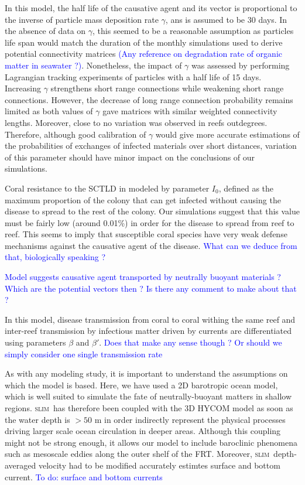 \documentclass[utf8]{frontiersSCNS}
\newcommand{\slim}{\textsc{slim}\ }
\begin{document}
In this model, the half life of the causative agent and its vector is proportional to the inverse of particle mass deposition rate $\gamma$, ans is assumed to be 30 days. In the absence of data on $\gamma$, this seemed to be a reasonable assumption as particles life span would match the duration of the monthly simulations used to derive potential connectivity matrices \textcolor{blue}{(Any reference on degradation rate of organic matter in seawater ?)}. Nonetheless, the impact of $\gamma$ was assessed by performing Lagrangian tracking experiments of particles with a half life of 15 days. Increasing $\gamma$ strengthens short range connections while weakening short range connections. However, the decrease of long range connection probability remains limited as both values of $\gamma$ gave matrices with similar weighted connectivity lengths. Moreover, close to no variation was observed in reefs outdegrees. Therefore, although good calibration of $\gamma$ would give more accurate estimations of the probabilities of exchanges of infected materials over short distances, variation of this parameter should have minor impact on the conclusions of our simulations.

Coral resistance to the SCTLD in modeled by parameter $I_0$, defined as the maximum proportion of the colony that can get infected without causing the disease to spread to the rest of the colony. Our simulations suggest that this value must be fairly low (around 0.01\%) in order for the disease to spread from reef to reef. This seems to imply that susceptible coral species have very weak defense mechanisms against the causative agent of the disease. \textcolor{blue}{What can we deduce from that, biologically speaking ?}

\textcolor{blue}{Model suggests causative agent transported by neutrally buoyant materials ? Which are the potential vectors then ? Is there any comment to make about that ?}

In this model, disease transmission from coral to coral withing the same reef and inter-reef transmission by infectious matter driven by currents are differentiated using parameters $\beta$ and $\beta'$. \textcolor{blue}{Does that make any sense though ? Or should we simply consider one single transmission rate}

As with any modeling study, it is important to understand the assumptions on which the model is based. Here, we have used a 2D barotropic ocean model, which is well suited to simulate the fate of neutrally-buoyant matters in shallow regions. \slim has therefore been coupled with the 3D HYCOM model as soon as the water depth is $>50$ m in order indirectly represent the physical processes driving larger scale ocean circulation in deeper areas. Although this coupling might not be strong enough, it allows our model to include baroclinic phenomena such as mesoscale eddies along the outer shelf of the FRT. Moreover, \slim depth-averaged velocity had to be modified accurately estimtes surface and bottom current.  \textcolor{blue}{To do: surface and bottom currents}
\end{document}
